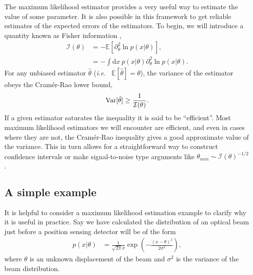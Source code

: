 The maximum likelihood estimator provides a very useful way to estimate the value of some parameter.  It is also possible in this framework to get reliable estimates of the expected errors of the estimators.  To begin, we will introduce a quantity known as Fisher information \cite{Casella2002, Wasserman2004},
\begin{align}
\nonumber  \mathcal{I}(\theta) &= -\mathbb{E}\left[\partial^2_\theta \ln p(x|\theta)\right], \\
                               &= -\int \text{d}x~ p(x|\theta)\partial^2_\theta \ln p(x|\theta).
\end{align}
For any unbiased estimator $\hat{\theta}$ (\emph{i.e.~} $\mathbb{E}[\hat{\theta}] = \theta$), the variance of the estimator obeys the Cram\'{e}r-Rao lower bound,
\begin{align}
  {\rm {Var}}[\hat{\theta}] \ge \frac{1}{\mathcal{I}(\theta)}.
\end{align}
If a given estimator saturates the inequality it is said to be ``efficient''.  Most maximum likelihood estimators we will encounter are efficient, and even in cases where they are not, the Cram\'{e}r-Rao inequality gives a good approximate value of the variance.  This in turn allows for a straightforward way to construct confidence intervals or make signal-to-noise type arguments like $\theta_{min} \sim \mathcal{I}(\theta)^{-1/2}$.

\subsection{A simple example}
It is helpful to consider a maximum likelihood estimation example to clarify why it is useful in practice.  Say we have calculated the distribution of an optical beam just before a position sensing detector will be of the form
\begin{align}
  p(x|\theta) &= \frac{1}{\sqrt{2\pi}\sigma}\exp\left(-\frac{(x-\theta)^2}{2\sigma^2} \right),
\end{align}
where $\theta$ is an unknown displacement of the beam and $\sigma^2$ is the variance of the beam distribution.

